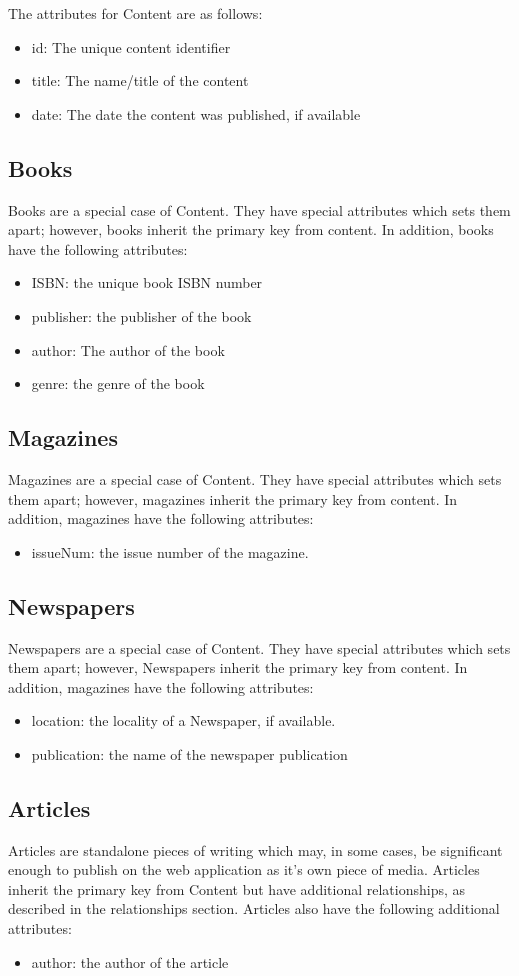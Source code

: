 \documentclass[letter, 12pt, titlepage]{article}
\begin{document}
				The attributes for Content are as follows:
			\begin{itemize}
				\item id: The unique content identifier
				\item title: The name/title of the content
				\item date: The date the content was published, if available
			\end{itemize}
			\subsection{Books}
				Books are a special case of Content. They have special attributes which sets them apart; however, books inherit the primary key from content. In addition, books have the following attributes:
			\begin{itemize}
				\item ISBN: the unique book ISBN number
				\item publisher: the publisher of the book
				\item author: The author of the book
				\item genre: the genre of the book
			\end{itemize}
			\subsection{Magazines}
				Magazines are a special case of Content. They have special attributes which sets them apart; however, magazines inherit the primary key from content. In addition, magazines have the following attributes:
			\begin{itemize}
				\item issueNum: the issue number of the magazine.
			\end{itemize}		
			\subsection{Newspapers} 
				Newspapers are a special case of Content. They have special attributes which sets them apart; however, Newspapers inherit the primary key from content. In addition, magazines have the following attributes:
			\begin{itemize}
				\item location: the locality of a Newspaper, if available.
				\item publication: the name of the newspaper publication
			\end{itemize}	
			\subsection{Articles}		
			Articles are standalone pieces of writing which may, in some cases, be significant enough to publish on the web application as it's own piece of media. Articles inherit the primary key from Content but have additional relationships, as described in the relationships section. Articles also have the following additional attributes:
			\begin{itemize}
				\item author: the author of the article
			\end{itemize}
\end{document}
